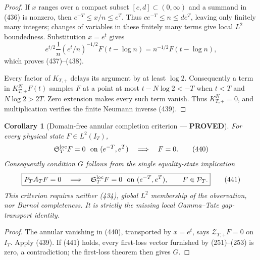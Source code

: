 \documentclass[11pt]{article}
\newtheorem{corollary}[theorem]{Corollary}
\newcommand{\PROVED}{\textcolor{green!45!black}{\textbf{PROVED}}}
\begin{document}
\begin{proof}
If $x$ ranges over a compact subset $[c,d]\subset(0,\infty)$ and a summand
in (436) is nonzero, then
$e^{-T}\le x/n\le e^T$.  Thus $ce^{-T}\le n\le de^T$, leaving only
finitely many integers; changes of variables in these finitely many terms
give local $L^2$ boundedness.  Substitution $x=e^t$ gives
\[
 e^{t/2}\frac1n(e^t/n)^{-1/2}F(t-\log n)
 =n^{-1/2}F(t-\log n),
\]
which proves (437)--(438).

Every factor of $K_{T,+}$ delays its argument by at least $\log2$.
Consequently a term in $K_{T,+}^{N}F(t)$ samples $F$ at a point at most
$t-N\log2<-T$ when $t<T$ and $N\log2>2T$.  Zero extension makes every such
term vanish.  Thus $K_{T,+}^{N}=0$, and multiplication verifies the finite
Neumann inverse (439).
\end{proof}

\begin{corollary}[Domain-free annular completion criterion --- \PROVED]
For every physical state $F\in L^2(I_T)$,
\begin{equation}
 \mathfrak S_T^{\rm loc}F=0\ \hbox{ on }(e^{-T},e^T)
 \quad\Longrightarrow\quad F=0.                    \tag{440}
\end{equation}
Consequently condition $G$ follows from the single equality-state
implication
\begin{equation}
 \boxed{
 P_TA_TF=0
 \quad\Longrightarrow\quad
 \mathfrak S_T^{\rm loc}F=0\ \hbox{ on }(e^{-T},e^T),
 \qquad F\in\mathcal P_T.}                          \tag{441}
\end{equation}
This criterion requires neither (434), global $L^2$ membership of the
observation, nor Burnol completeness.  It is strictly the missing local
Gamma--Tate gap-transport identity.
\end{corollary}

\begin{proof}
The annular vanishing in (440), transported by $x=e^t$, says
$\mathcal Z_{T,+}F=0$ on $I_T$.  Apply (439).  If (441) holds, every
first-loss vector furnished by (251)--(253) is zero, a contradiction; the
first-loss theorem then gives $G$.
\end{proof}
\end{document}

